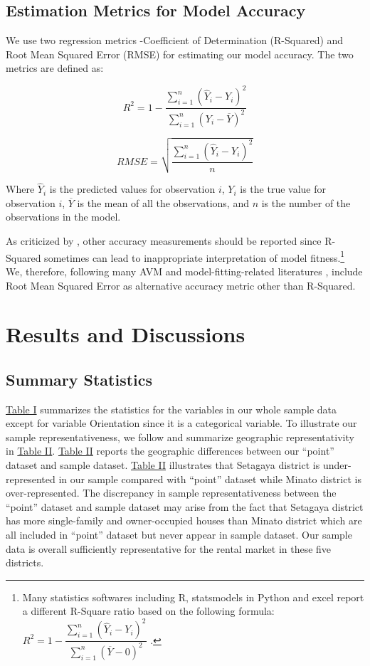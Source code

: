 \documentclass[a4paper, 12pt]{article} %
\begin{document}
\subsection{Estimation Metrics for Model Accuracy}
We use two regression metrics -Coefficient of Determination (R-Squared) and Root Mean Squared Error (RMSE) for estimating our model accuracy. The two metrics are defined as:

\begin{equation}
\label{eq17}
R^2 = 1 - \dfrac{\sum_{i=1}^n(\widehat{Y}_i - Y_i)^2}{\sum_{i=1}^n(Y_i-\overline{Y})^2}
\end{equation}

\begin{equation}
\label{eq18}
RMSE = \sqrt{\dfrac{\sum_{i=1}^n(\widehat{Y}_i - Y_i)^2}{n}}
\end{equation}

\noindent Where $\widehat{Y}_i$ is the predicted values for observation $i$, $Y_i$ is the true value for observation $i$, $\overline{Y}$ is the mean of all the observations, and $n$ is the number of the observations in the model. 

As criticized by \citet{alexander2015beware}, other accuracy measurements should be reported since R-Squared sometimes can lead to inappropriate interpretation of model fitness.\footnote{Many statistics softwares including R, statsmodels in Python and excel report a different R-Square ratio based on the following formula: $R^2 = 1- \dfrac{\sum_{i=1}^n(\widehat{Y}_i - Y_i)^2}{\sum_{i=1}^n(\overline{Y}-0)^2}$ .} We, therefore, following many AVM and model-fitting-related literatures \citep{limsombunchai2004house, faishal2005automated, mccluskey2012potential, bency2017beyond}, include Root Mean Squared Error as alternative accuracy metric other than R-Squared. 

\section{Results and Discussions}
\subsection{Summary Statistics}
\hyperref[tb1]{Table I} summarizes the statistics for the variables in our whole sample data except for variable Orientation since it is a categorical variable. To illustrate our sample representativeness, we follow \citet{djurdjevic2008estimation} and summarize geographic representativity in \hyperref[tb2]{Table II}. \hyperref[tb2]{Table II} reports the geographic differences between our “point” dataset and sample dataset. \hyperref[tb2]{Table II} illustrates that Setagaya district is under-represented in our sample compared with “point” dataset while Minato district is over-represented. The discrepancy in sample representativeness between the “point” dataset and sample dataset may arise from the fact that Setagaya district has more single-family and owner-occupied houses than Minato district which are all included in “point” dataset but never appear in sample dataset. Our sample data is overall sufficiently representative for the rental market in these five districts.
\end{document}
